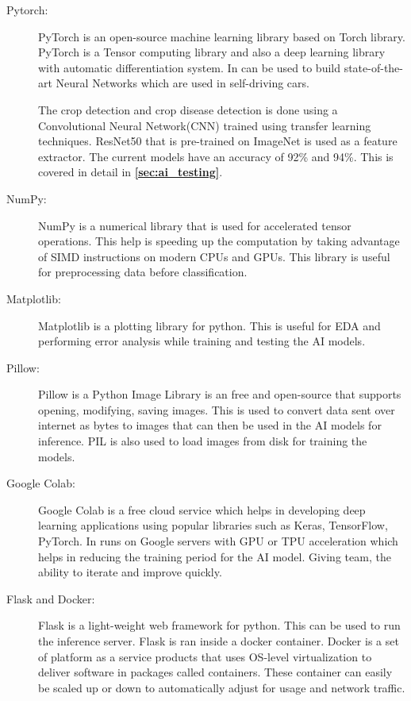 \documentclass[../Report.tex]{subfiles}
\begin{document}
\begin{description}
  \item[Pytorch:] PyTorch\cite{pytorch} is an open-source machine learning library based on Torch library. PyTorch is a Tensor computing library and also 
  a deep learning library with automatic differentiation system. In can be used to build state-of-the-art Neural Networks which are used in
  self-driving cars.\par
  The crop detection and crop disease detection is done using a Convolutional Neural Network(CNN)\cite{cnn} trained using transfer learning 
  techniques. ResNet50\cite{resnet} that is pre-trained on ImageNet\cite{imagenet} is used as a feature extractor.
  The current models have an accuracy of 92\% and 94\%. This is covered in detail in \textbf{\ref{sec:ai_testing}}.

  \item[NumPy:] NumPy\cite{numpy} is a numerical library that is used for accelerated tensor operations. This help is speeding up the computation by 
  taking advantage of SIMD instructions on modern CPUs and GPUs. This library is useful for preprocessing data before classification.

  \item[Matplotlib:] Matplotlib\cite{pyplot} is a plotting library for python. This is useful for EDA and performing error analysis while training 
  and testing the AI models.

  \item[Pillow:] Pillow\cite{pillow} is a Python Image Library is an free and open-source that supports opening, modifying, saving images. This is 
  used to convert data sent over internet as bytes to images that can then be used in the AI models for inference. PIL is also used to load 
  images from disk for training the models.

  \item[Google Colab:] Google Colab\cite{colab} is a free cloud service which helps in developing deep learning applications using popular libraries such 
  as Keras, TensorFlow, PyTorch. In runs on Google servers with GPU or TPU acceleration which helps in reducing the training period for 
  the AI model. Giving team, the ability to iterate and improve quickly.

  \item[Flask and Docker:] Flask\cite{flask} is a light-weight web framework for python. This can be used to run the inference server. Flask is ran
  inside a docker container. Docker is a set of platform as a service products that uses OS-level virtualization to deliver software in 
  packages called containers. These container can easily be scaled up or down to automatically adjust for usage and network traffic.


\end{description}
\end{document}
